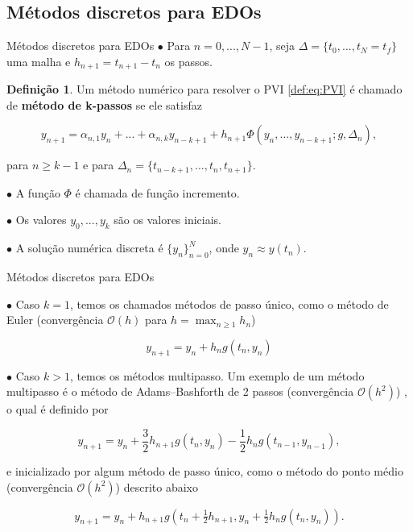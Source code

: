 \documentclass{beamer}
\theoremstyle{plain}
\theoremstyle{definition}
\newtheorem{defi}{Definição}
\begin{document}


\subsection{Métodos discretos para EDOs}


\begin{frame}{Métodos discretos para EDOs}
    \small
    \phantom{aa} $\bullet$ Para $n = 0, ..., N-1$, seja $\Delta = \{ t_0, ..., t_N = t_f\}$ uma malha e $h_{n+1} = t_{n+1} - t_n$ os passos.

    \begin{defi}
        Um método numérico para resolver o PVI \eqref{def:eq:PVI} é chamado de \textbf{método de k-passos} se ele satisfaz 

        \begin{equation}
            y_{n+1} = \alpha_{n, 1} y_n + ... + \alpha_{n, k} y_{n - k + 1} + h_{n+1} \Phi( y_n, ..., y_{n-k+1}; g, \Delta_n), 
            \label{chap3:def:eq:ODE_method}
        \end{equation}

        para $n \geq k - 1$ e para $\Delta_n = \{ t_{n - k + 1}, ..., t_n, t_{n+1}\} $.

    \end{defi}

    \phantom{aa} $\bullet$ A função $\Phi$ é chamada de função incremento.

    \phantom{aa} $\bullet$ Os valores $y_0, ..., y_k$ são os valores iniciais.

    \phantom{aa} $\bullet$ A solução numérica discreta é $\{y_{n}\}_{n=0}^{N}$, onde  $y_{n} \approx y(t_{n})$.


\end{frame}


\begin{frame}{Métodos discretos para EDOs}

    \small


    \phantom{aa} $\bullet$ Caso $k = 1$, temos os chamados métodos de passo único, como o método de Euler (convergência $\mathcal{O}(h)$ para $h = \max_{n \geq 1} h_n$) 

    \[
        y_{n+1} = y_n + h_n g(t_n, y_n)
    \]

    \phantom{aa} $\bullet$ Caso $k > 1$, temos os métodos multipasso. Um exemplo de um método multipasso é o método de Adams–Bashforth de 2 passos (convergência $\mathcal{O}(h^2)$) , o qual é definido por 


    \[
        y_{n+1} = y_{n} + \frac{3}{2} h_{n+1} g(t_{n},y_{n}) - \frac{1}{2} h_{n}g(t_{n-1},y_{n-1}),
    \]

    \noindent
    e  inicializado por algum método de passo único, como o método do ponto médio (convergência $\mathcal{O}(h^2)$) descrito abaixo

    \[
        y_{n+1}=y_{n}+h_{n+1}g\left(t_{n}+{\tfrac {1}{2}}h_{n+1},y_{n}+{\tfrac{1}{2}}h_{n}g(t_{n},y_{n})\right).
    \]
\end{frame}
\end{document}
